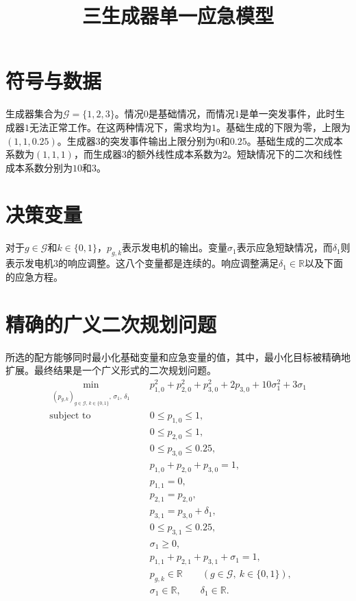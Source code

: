 \documentclass[11pt]{article}
\title{三生成器单一应急模型}
\author{}
\date{}
\begin{document}
\maketitle

\section*{符号与数据}
生成器集合为$\mathcal G=\{1,2,3\}$。情况$0$是基础情况，而情况$1$是单一突发事件，此时生成器$1$无法正常工作。在这两种情况下，需求均为$1$。基础生成的下限为零，上限为$(1,1,0.25)$。生成器$3$的突发事件输出上限分别为$0$和$0.25$。基础生成的二次成本系数为$(1,1,1)$，而生成器$3$的额外线性成本系数为$2$。短缺情况下的二次和线性成本系数分别为$10$和$3$。

\section*{决策变量}
对于$g\in\mathcal G$和$k\in\{0,1\}$，$p_{g,k}$表示发电机的输出。变量$\sigma_1$表示应急短缺情况，而$\delta_1$则表示发电机$3$的响应调整。这八个变量都是连续的。响应调整满足$\delta_1\in\mathbb R$以及下面的应急方程。

\section*{精确的广义二次规划问题}
所选的配方能够同时最小化基础变量和应急变量的值，其中，最小化目标被精确地扩展。最终结果是一个广义形式的二次规划问题。
\begin{align}
\min_{\substack{(p_{g,k})_{g\in\mathcal G,\,k\in\{0,1\}},\,\sigma_1,\,\delta_1}}
\quad & p_{1,0}^{2}+p_{2,0}^{2}+p_{3,0}^{2}
       +2p_{3,0}+10\sigma_1^{2}+3\sigma_1
       \label{eq:objective}\\
\text{subject to}\quad
&0\le p_{1,0}\le 1,\\
&0\le p_{2,0}\le 1,\\
&0\le p_{3,0}\le 0.25,\\
&p_{1,0}+p_{2,0}+p_{3,0}=1,\\
&p_{1,1}=0,\\
&p_{2,1}=p_{2,0},\\
&p_{3,1}=p_{3,0}+\delta_1,\\
&0\le p_{3,1}\le 0.25,\\
&\sigma_1\ge 0,\\
&p_{1,1}+p_{2,1}+p_{3,1}+\sigma_1=1,\\
&p_{g,k}\in\mathbb R
  \qquad(g\in\mathcal G,\ k\in\{0,1\}),\\
&\sigma_1\in\mathbb R,\qquad \delta_1\in\mathbb R.
\end{align}
\end{document}
